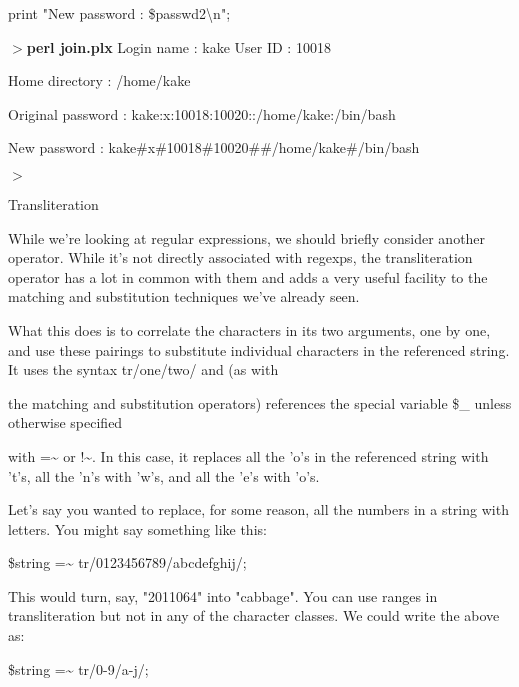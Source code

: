 \documentclass[a4paper,11pt]{book}
\begin{document}
\noindent print "New password : \$passwd2\textbackslash n";

\noindent 

\noindent $>$\textbf{perl join.plx }Login name : kake User ID : 10018

\noindent Home directory : /home/kake

\noindent Original password : kake:x:10018:10020::/home/kake:/bin/bash

\noindent New password : kake\#x\#10018\#10020\#\#/home/kake\#/bin/bash

\noindent $>$

\noindent 

\noindent 

\noindent Transliteration

\noindent 

\noindent While we're looking at regular expressions, we should briefly consider another operator. While it's not directly associated with regexps, the transliteration operator has a lot in common with them and adds a very useful facility to the matching and substitution techniques we've already seen.

\noindent 

\noindent What this does is to correlate the characters in its two arguments, one by one, and use these pairings to substitute individual characters in the referenced string. It uses the syntax tr/one/two/ and (as with

\noindent the matching and substitution operators) references the special variable \$\_ unless otherwise specified

\noindent with =\~{} or !\~{}. In this case, it replaces all the 'o's in the referenced string with 't's, all the 'n's with 'w's, and all the 'e's with 'o's.

\noindent 

\noindent Let's say you wanted to replace, for some reason, all the numbers in a string with letters. You might say something like this:

\noindent 

\noindent \$string =\~{} tr/0123456789/abcdefghij/;

\noindent 

\noindent This would turn, say, "2011064" into "cabbage". You can use ranges in transliteration but not in any of the character classes. We could write the above as:

\noindent 

\noindent \$string =\~{} tr/0-9/a-j/;
\end{document}
